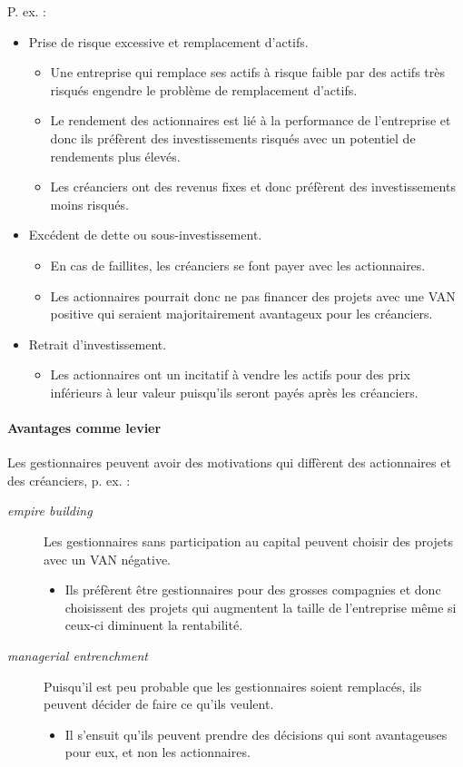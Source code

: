 \documentclass[10pt, french]{article}
\begin{document}
\begin{multicols*}{2}
P. ex. : 
\begin{itemize}
	\item	Prise de risque excessive et remplacement d'actifs.
		\begin{itemize}
		\item	Une entreprise qui remplace ses actifs à risque faible par des actifs très risqués engendre le problème de remplacement d'actifs.
		\item	Le rendement des actionnaires est lié à la performance de l'entreprise et donc ils préfèrent des investissements risqués avec un potentiel de rendements plus élevés.
		\item	Les créanciers ont des revenus fixes et donc préfèrent des investissements moins risqués.
		\end{itemize}
	\item	Excédent de dette ou sous-investissement.
		\begin{itemize}
		\item	En cas de faillites, les créanciers se font payer avec les actionnaires.
		\item	Les actionnaires pourrait donc ne pas financer des projets avec une VAN positive qui seraient majoritairement avantageux pour les créanciers. 
		\end{itemize}
	\item	Retrait d'investissement.
		\begin{itemize}
		\item	Les actionnaires ont un incitatif à vendre les actifs pour des prix inférieurs à leur valeur puisqu'ils seront payés après les créanciers.
		\end{itemize}
\end{itemize}


\paragraph{Avantages comme levier}
Les gestionnaires peuvent avoir des motivations qui diffèrent des actionnaires et des créanciers, p. ex. : 
\begin{description}
	\item[\og \textit{empire building} \fg{}]	Les gestionnaires sans participation au capital peuvent choisir des projets avec un VAN négative.
		\begin{itemize}
		\item	Ils préfèrent être gestionnaires pour des grosses compagnies et donc choisissent des projets qui augmentent la taille de l'entreprise même si ceux-ci diminuent la rentabilité.
		\end{itemize}
	\item[\og \textit{managerial entrenchment} \fg{}]	Puisqu'il est peu probable que les gestionnaires soient remplacés, ils peuvent décider de faire ce qu'ils veulent.
		\begin{itemize}
		\item	Il s'ensuit qu'ils peuvent prendre des décisions qui sont avantageuses pour eux, et non les actionnaires.
		\end{itemize}
\end{description}


\end{multicols*}
\end{document}
